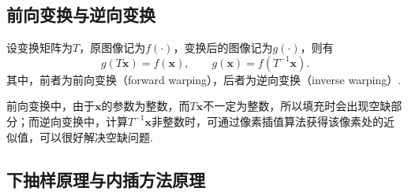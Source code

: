 \documentclass[12pt, a4paper, oneside]{ctexart}
\numberwithin{equation}{section}  %
\def\bd{\boldsymbol}        %
\begin{document}
\subsection{前向变换与逆向变换}
设变换矩阵为$T$，原图像记为$f(\cdot)$，变换后的图像记为$g(\cdot)$，则有
\begin{equation*}
    g(T\bd{x}) = f(\bd{x}),\qquad g(\bd{x}) = f(T^{-1}\bd{x}).
\end{equation*}
其中，前者为前向变换（forward warping），后者为逆向变换（inverse warping）. 

前向变换中，由于$\bd{x}$的参数为整数，而$T\bd{x}$不一定为整数，所以填充时会出现空缺部分；而逆向变换中，计算$T^{-1}\bd{x}$非整数时，可通过像素插值算法获得该像素处的近似值，可以很好解决空缺问题.
\subsection{下抽样原理与内插方法原理}
\end{document}
